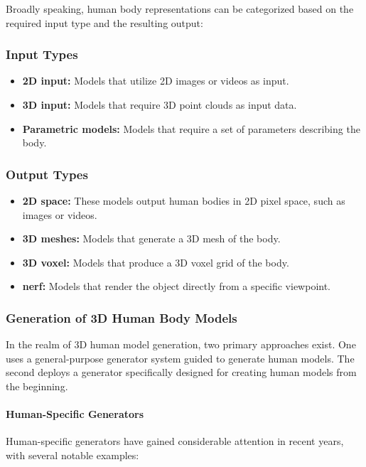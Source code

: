 Broadly speaking, human body representations can be categorized based on the
required input type and the resulting output:

\subsubsection{Input Types}

\begin{itemize}
	\item \textbf{2D input:} Models that utilize 2D images or videos as input.
	\item \textbf{3D input:} Models that require 3D point clouds as input data.
	\item \textbf{Parametric models:} Models that require a set of parameters describing the body.
\end{itemize}

\subsubsection{Output Types}

\begin{itemize}
	\item \textbf{2D space:} These models output human bodies in 2D pixel space, such as images or videos.
	\item \textbf{3D meshes:} Models that generate a 3D mesh of the body.
	\item \textbf{3D voxel:} Models that produce a 3D voxel grid of the body.
	\item \textbf{\gls{nerf}:} Models that render the object directly from a specific viewpoint.
\end{itemize}

\subsubsection{Generation of 3D Human Body Models}

In the realm of 3D human model generation, two primary approaches exist. One
uses a general-purpose generator system guided to generate human models. The
second deploys a generator specifically designed for creating human models from
the beginning.

\paragraph{Human-Specific Generators}

Human-specific generators have gained considerable attention in recent years,
with several notable examples:

